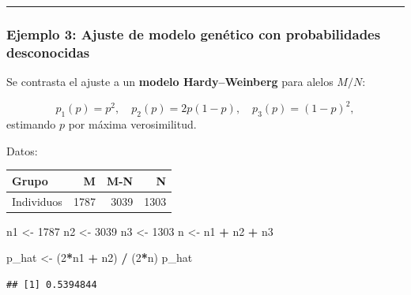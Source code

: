 \documentclass[
]{article}
\newenvironment{Shaded}{\begin{snugshade}}{\end{snugshade}}
\newcommand{\DecValTok}[1]{\textcolor[rgb]{0.00,0.00,0.81}{#1}}
\newcommand{\NormalTok}[1]{#1}
\newcommand{\OtherTok}[1]{\textcolor[rgb]{0.56,0.35,0.01}{#1}}
\newcommand{\SpecialCharTok}[1]{\textcolor[rgb]{0.81,0.36,0.00}{\textbf{#1}}}
\begin{document}
\begin{center}\rule{0.5\linewidth}{0.5pt}\end{center}

\subsubsection{Ejemplo 3: Ajuste de modelo genético con probabilidades desconocidas}\label{ejemplo-3-ajuste-de-modelo-genuxe9tico-con-probabilidades-desconocidas-1}

Se contrasta el ajuste a un \textbf{modelo Hardy--Weinberg} para alelos \(M/N\):

\[p_1(p)=p^2,\quad p_2(p)=2p(1-p),\quad p_3(p)=(1-p)^2,\]
estimando \(p\) por máxima verosimilitud.

Datos:

\begin{longtable}[]{@{}lrrr@{}}
\toprule\noalign{}
Grupo & M & M-N & N \\
\midrule\noalign{}
\endhead
\bottomrule\noalign{}
\endlastfoot
Individuos & 1787 & 3039 & 1303 \\
\end{longtable}

\begin{Shaded}
\begin{Highlighting}[]
\NormalTok{n1 }\OtherTok{\textless{}{-}} \DecValTok{1787}
\NormalTok{n2 }\OtherTok{\textless{}{-}} \DecValTok{3039}
\NormalTok{n3 }\OtherTok{\textless{}{-}} \DecValTok{1303}
\NormalTok{n  }\OtherTok{\textless{}{-}}\NormalTok{ n1 }\SpecialCharTok{+}\NormalTok{ n2 }\SpecialCharTok{+}\NormalTok{ n3}

\NormalTok{p\_hat }\OtherTok{\textless{}{-}}\NormalTok{ (}\DecValTok{2}\SpecialCharTok{*}\NormalTok{n1 }\SpecialCharTok{+}\NormalTok{ n2) }\SpecialCharTok{/}\NormalTok{ (}\DecValTok{2}\SpecialCharTok{*}\NormalTok{n)}
\NormalTok{p\_hat}
\end{Highlighting}
\end{Shaded}

\begin{verbatim}
## [1] 0.5394844
\end{verbatim}
\end{document}
